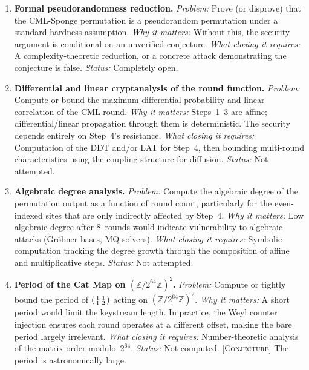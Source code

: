 \documentclass[runningheads]{llncs}
\newcommand{\conjecture}[1]{\textsc{[Conjecture]} #1}
\newcommand{\Ztwo}{\mathbb{Z}/2^{64}\mathbb{Z}}
\begin{document}
\begin{enumerate}

\item \textbf{Formal pseudorandomness reduction.}
  \emph{Problem:} Prove (or disprove) that the CML-Sponge permutation is
  a pseudorandom permutation under a standard hardness assumption.
  \emph{Why it matters:} Without this, the security argument is conditional
  on an unverified conjecture.
  \emph{What closing it requires:} A complexity-theoretic reduction, or a
  concrete attack demonstrating the conjecture is false.
  \emph{Status:} Completely open.

\item \textbf{Differential and linear cryptanalysis of the round function.}
  \emph{Problem:} Compute or bound the maximum differential probability and
  linear correlation of the CML round.
  \emph{Why it matters:} Steps~1--3 are affine; differential/linear propagation
  through them is deterministic.  The security depends entirely on Step~4's
  resistance.
  \emph{What closing it requires:} Computation of the DDT and/or LAT for
  Step~4, then bounding multi-round characteristics using the coupling
  structure for diffusion.
  \emph{Status:} Not attempted.

\item \textbf{Algebraic degree analysis.}
  \emph{Problem:} Compute the algebraic degree of the permutation output as a
  function of round count, particularly for the even-indexed sites that are
  only indirectly affected by Step~4.
  \emph{Why it matters:} Low algebraic degree after 8~rounds would indicate
  vulnerability to algebraic attacks (Gr\"obner bases, MQ solvers).
  \emph{What closing it requires:} Symbolic computation tracking the degree
  growth through the composition of affine and multiplicative steps.
  \emph{Status:} Not attempted.

\item \textbf{Period of the Cat Map on $(\Ztwo)^2$.}
  \emph{Problem:} Compute or tightly bound the period of
  $\begin{psmallmatrix}1&1\\1&2\end{psmallmatrix}$ acting on $(\Ztwo)^2$.
  \emph{Why it matters:} A short period would limit the keystream length.
  In practice, the Weyl counter injection ensures each round operates
  at a different offset, making the bare period largely irrelevant.
  \emph{What closing it requires:} Number-theoretic analysis of the matrix
  order modulo~$2^{64}$.
  \emph{Status:} Not computed.  \conjecture{The period is astronomically large.}


\end{enumerate}
\end{document}
